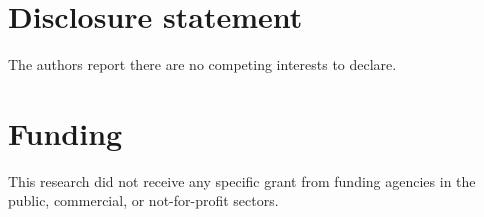 \documentclass[]{interact}
\theoremstyle{plain}%
\theoremstyle{definition}
\theoremstyle{remark}
\begin{document}
\section*{Disclosure statement}

The authors report there are no competing interests to declare.


\section*{Funding}

This research did not receive any specific grant from funding agencies in the public,
commercial, or not-for-profit sectors.




\end{document}
